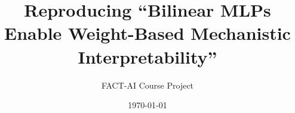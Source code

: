 \documentclass[10pt]{beamer}
\title{Reproducing ``Bilinear MLPs Enable Weight-Based Mechanistic Interpretability''}
\author{FACT-AI Course Project}
\date{\today}
\begin{document}
\begin{frame}
    \titlepage
\end{frame}






\appendix

\end{document}
